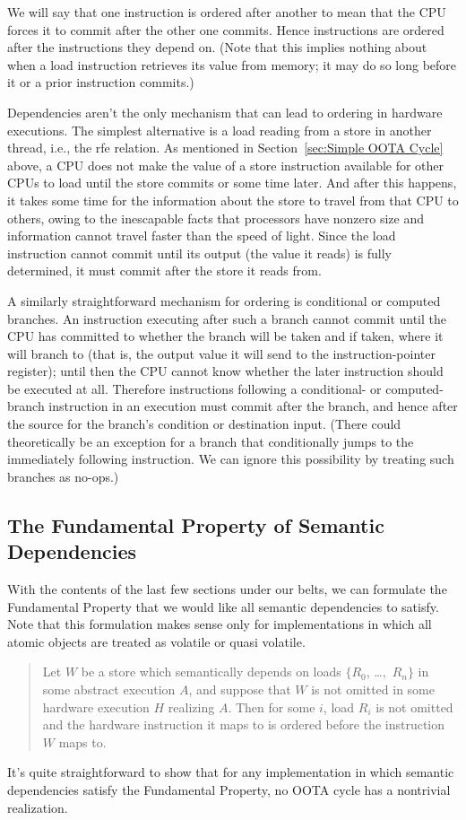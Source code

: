 \documentclass[10]{article}
\begin{document}
We will say that one instruction is ordered after another to mean that
the CPU forces it to commit after the other one commits.
Hence instructions are ordered after the instructions they depend on.
(Note that this implies nothing about when a load instruction retrieves
its value from memory; it may do so long before it or a prior
instruction commits.)

Dependencies aren't the only mechanism that can lead to
ordering in hardware executions.
The simplest alternative is a load reading from a store in another
thread, i.e., the rfe relation.
As mentioned in Section~\ref{sec:Simple OOTA Cycle} above, a CPU does
not make the value of a store instruction available for other CPUs to
load until the store commits or some time later.
And after this happens, it takes some time for the information about
the store to travel from that CPU to others, owing to the inescapable
facts that processors have nonzero size and information cannot travel
faster than the speed of light.
Since the load instruction cannot commit until its output (the value it
reads) is fully determined, it must commit after the store it reads
from.

A similarly straightforward mechanism for ordering is conditional or
computed branches.
An instruction executing after such a branch cannot commit
until the CPU has committed to whether the branch will be taken and
if taken, where it will branch to (that is, the output value it will
send to the instruction-pointer register);
until then the CPU cannot know whether the later instruction should
be executed at all.
Therefore instructions following a conditional- or computed-branch
instruction in an execution must commit after the branch, and hence
after the source for the branch's condition or destination input.
(There could theoretically be an exception for a branch that
conditionally jumps to the immediately following instruction.
We can ignore this possibility by treating such branches as no-ops.)

\subsection{The Fundamental Property of Semantic Dependencies}
\label{sec:The Fundamental Property of Semantic Dependencies}

With the contents of the last few sections under our belts, we can
formulate the Fundamental Property that we would like all semantic
dependencies to satisfy.
Note that this formulation makes sense only for implementations in
which all atomic objects are treated as volatile or quasi volatile.
\begin{quote}
Let $W$ be a store which semantically depends on loads
$\{R_0$, \ldots,~$R_n\}$ in some abstract execution $A$,
and suppose that $W$ is not
omitted in some hardware execution $H$ realizing $A$.
Then for some $i$, load $R_i$ is not omitted and the hardware
instruction it maps to is ordered before the instruction $W$ maps to.
\end{quote}
It's quite straightforward to show that for any implementation in which
semantic dependencies satisfy the Fundamental Property, no OOTA cycle
has a nontrivial realization.
\end{document}
